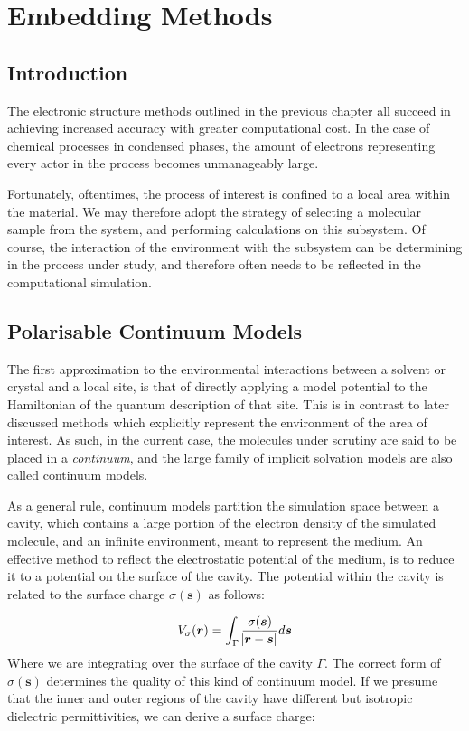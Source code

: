 \chapter{Embedding Methods}
\label{chap:emb}
\section{Introduction}
The electronic structure methods outlined in the previous chapter all succeed in achieving increased accuracy with greater computational cost. In the case of chemical processes in condensed phases, the amount of electrons representing every actor in the process becomes unmanageably large.

Fortunately, oftentimes, the process of interest is confined to a local area within the material. We may therefore adopt the strategy of selecting a molecular sample from the system, and performing calculations on this subsystem. Of course, the interaction of the environment with the subsystem can be determining in the process under study, and therefore often needs to be reflected in the computational simulation.

\section{Polarisable Continuum Models}
The first approximation to the environmental interactions between a solvent or crystal and a local site, is that of directly applying a model potential to the Hamiltonian of the quantum description of that site. This is in contrast to later discussed methods which explicitly represent the environment of the area of interest. As such, in the current case, the molecules under scrutiny are said to be placed in a \textit{continuum}, and the large family of implicit solvation models are also called continuum models.\cite{Tomasi2005}

As a general rule, continuum models partition the simulation space between a cavity, which contains a large portion of the electron density of the simulated molecule, and an infinite environment, meant to represent the medium. An effective method to reflect the electrostatic potential of the medium, is to reduce it to a potential on the surface of the cavity. The potential within the cavity is related to the surface charge $\sigma(\bm{s})$ as follows:\cite{Mennucci2012}

\begin{equation}
    V_{\sigma}(\bm{r}) = \int_{\Gamma} \frac{\sigma(\bm{s})}{\abs{\bm{r}-\bm{s}}} d\bm{s}
\end{equation}
Where we are integrating over the surface of the cavity $\Gamma$. The correct form of $\sigma(\bm{s})$ determines the quality of this kind of continuum model. If we presume that the inner and outer regions of the cavity have different but isotropic dielectric permittivities, we can derive a surface charge:\cite{Miertus1981}

